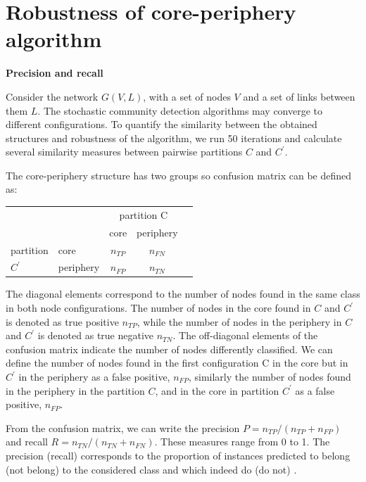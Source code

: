 \chapter{Robustness of core-periphery algorithm} %
\label{App:robust}
\textbf{Precision and recall}

Consider the network $G(V, L)$, with a set of nodes $V$ and a set of links between them $L$. The stochastic community detection algorithms may converge to different configurations. To quantify the similarity between the obtained structures and robustness of the algorithm, we run 50 iterations and calculate several similarity measures between pairwise partitions $C$ and $C^{'}$.

The core-periphery structure has two groups so confusion matrix \cite{labatut2012accuracy} can be defined as:

\begin{center}
	
	\begin{tabular}{l|l|c|c|c} 
		
		\multicolumn{2}{c}{}&\multicolumn{2}{c}{partition C}&\\ 
		
		\cline{3-4} 
		\multicolumn{2}{c|}{}&core&periphery&\multicolumn{1}{c}{}\\
		\cline{2-4} 
		partition & core & $n_{TP}$ & $n_{FN}$ & \\ 
		\cline{2-4} $C^{'}$ & periphery & $n_{FP}$ & $n_{TN}$ & \\ 
		\cline{2-4}
	\end{tabular}
\end{center}

The diagonal elements correspond to the number of nodes found in the same class in both node configurations. The number of nodes in the core found in $C$ and $C^{'}$ is denoted as true positive $n_{TP}$, while the number of nodes in the periphery in $C$ and $C^{'}$ is denoted as true negative $n_{TN}$. The off-diagonal elements of the confusion matrix indicate the number of nodes differently classified. We can define the number of nodes found in the first configuration C in the core but in $C^{'}$ in the periphery as a false positive, $n_{FP}$, similarly the number of nodes found in the periphery in the partition $C$, and in the core in partition $C^{'}$ as a false positive, $n_{FP}$. 

From the confusion matrix, we can write the precision $P =n_{TP}/(n_{TP}+n_{FP})$ and recall $R=n_{TN}/(n_{TN}+n_{FN})$. These measures range from 0 to 1. The precision (recall) corresponds to the proportion of instances predicted to belong (not belong) to the considered class and which indeed do (do not) \cite{labatut2012accuracy}.

